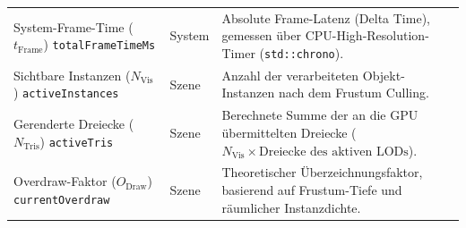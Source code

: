 \begin{longtable}{@{} >{\raggedright\arraybackslash}p{} p{}
        >{\raggedright\arraybackslash}p{} @{}}
    System-Frame-Time ($t_{\text{Frame}}$) \newline \scriptsize{\texttt{totalFrameTimeMs}} & System & Absolute
    Frame-Latenz (Delta Time), gemessen über \ac{CPU}-High-Resolution-Timer (\texttt{std::chrono}). \\

    Sichtbare Instanzen ($N_{\text{Vis}}$) \newline \scriptsize{\texttt{activeInstances}} & Szene & Anzahl der
    verarbeiteten Objekt-Instanzen nach dem Frustum Culling. \\

    Gerenderte Dreiecke ($N_{\text{Tris}}$) \newline \scriptsize{\texttt{activeTris}} & Szene & Berechnete Summe der an
    die \ac{GPU} übermittelten Dreiecke ($N_{\text{Vis}} \times \text{Dreiecke des aktiven LODs}$). \\

    Overdraw-Faktor ($O_{\text{Draw}}$) \newline \scriptsize{\texttt{currentOverdraw}} & Szene & Theoretischer
    Überzeichnungsfaktor, basierend auf Frustum-Tiefe und räumlicher Instanzdichte. \\
\end{longtable}

